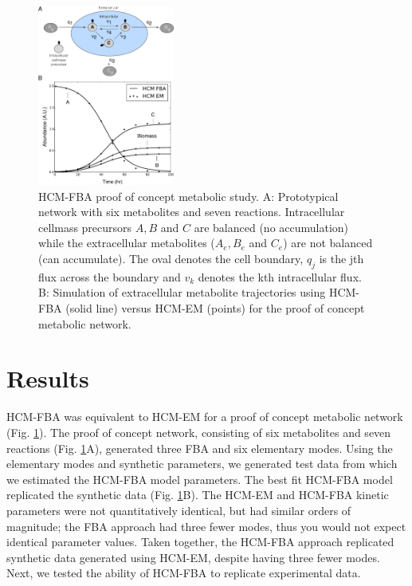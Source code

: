 \documentclass[10pt,twocolumn,twoside,final]{IEEEtran}
\begin{document}
\begin{figure}[!t]\centering
\includegraphics[width=0.40\textwidth]{./figs/Fig-1-GeneralModel-Results.pdf}
\caption{HCM-FBA proof of concept metabolic study.
A: Prototypical network with six metabolites and seven reactions.
Intracellular cellmass precursors $A,B$ and $C$ are balanced (no accumulation) while the extracellular metabolites ($A_{e},B_{e}$ and $C_{e}$) are not balanced (can accumulate).
The oval denotes the cell boundary, $q_{j}$ is the jth flux across the boundary and $v_{k}$ denotes the kth intracellular flux.
B: Simulation of extracellular metabolite trajectories using HCM-FBA (solid line) versus HCM-EM (points) for the proof of concept metabolic network.
}\label{fig:model-fitting}
\end{figure}

\section{Results}
HCM-FBA was equivalent to HCM-EM for a proof of concept metabolic network (Fig. \ref{fig:model-fitting}).
The proof of concept network, consisting of six metabolites and seven reactions (Fig. \ref{fig:model-fitting}A), generated three FBA and six elementary modes.
Using the elementary modes and synthetic parameters, we generated test data from which we estimated the HCM-FBA model parameters.
The best fit HCM-FBA model replicated the synthetic data (Fig. \ref {fig:model-fitting}B).
The HCM-EM and HCM-FBA kinetic parameters were not quantitatively identical, but had similar orders of magnitude;
the FBA approach had three fewer modes, thus you would not expect identical parameter values.
Taken together, the HCM-FBA approach replicated synthetic data generated using HCM-EM, despite having three fewer modes.
Next, we tested the ability of HCM-FBA to replicate experimental data.
\end{document}
